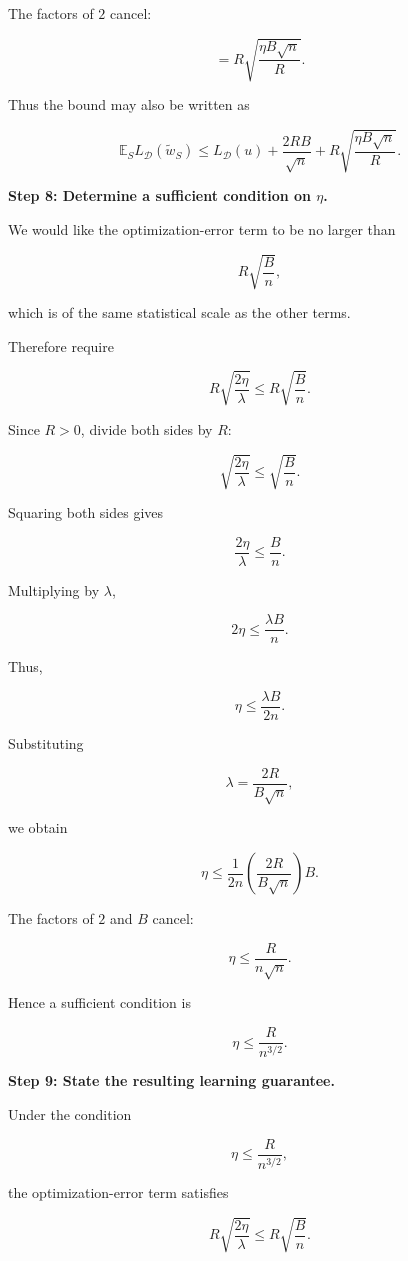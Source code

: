 \documentclass[11pt]{article}
\newcommand{\E}{\mathbb{E}}
\begin{document}
\begin{enumerate}
\begin{solutionbox}
The factors of \(2\) cancel:

\[
=
R
\sqrt{
\frac{\eta B\sqrt n}{R}
}.
\]

Thus the bound may also be written as

\[
\boxed{
\E_S L_{\mathcal D}(\widetilde w_S)
\le
L_{\mathcal D}(u)
+
\frac{2RB}{\sqrt n}
+
R
\sqrt{
\frac{\eta B\sqrt n}{R}
}
}.
\]

\medskip

\textbf{Step 8: Determine a sufficient condition on \(\eta\).}

We would like the optimization-error term to be no larger than

\[
R\sqrt{\frac{B}{n}},
\]

which is of the same statistical scale as the other terms.

Therefore require

\[
R\sqrt{\frac{2\eta}{\lambda}}
\le
R\sqrt{\frac{B}{n}}.
\]

Since \(R>0\), divide both sides by \(R\):

\[
\sqrt{\frac{2\eta}{\lambda}}
\le
\sqrt{\frac{B}{n}}.
\]

Squaring both sides gives

\[
\frac{2\eta}{\lambda}
\le
\frac{B}{n}.
\]

Multiplying by \(\lambda\),

\[
2\eta
\le
\frac{\lambda B}{n}.
\]

Thus,

\[
\eta
\le
\frac{\lambda B}{2n}.
\]

Substituting

\[
\lambda
=
\frac{2R}{B\sqrt n},
\]

we obtain

\[
\eta
\le
\frac{1}{2n}
\left(
\frac{2R}{B\sqrt n}
\right)
B.
\]

The factors of \(2\) and \(B\) cancel:

\[
\eta
\le
\frac{R}{n\sqrt n}.
\]

Hence a sufficient condition is

\[
\boxed{
\eta
\le
\frac{R}{n^{3/2}}.
}
\]

\medskip

\textbf{Step 9: State the resulting learning guarantee.}

Under the condition

\[
\eta
\le
\frac{R}{n^{3/2}},
\]

the optimization-error term satisfies

\[
R\sqrt{\frac{2\eta}{\lambda}}
\le
R\sqrt{\frac{B}{n}}.
\]


\end{solutionbox}
\end{enumerate}
\end{document}
